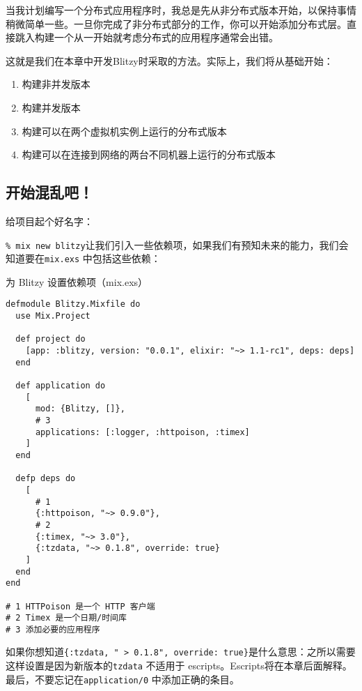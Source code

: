 当我计划编写一个分布式应用程序时，我总是先从非分布式版本开始，以保持事情稍微简单一些。一旦你完成了非分布式部分的工作，你可以开始添加分布式层。直接跳入构建一个从一开始就考虑分布式的应用程序通常会出错。

这就是我们在本章中开发Blitzy时采取的方法。实际上，我们将从基础开始：

\begin{enumerate}
\def\labelenumi{\arabic{enumi}.}

\item  构建非并发版本
\item  构建并发版本
\item  构建可以在两个虚拟机实例上运行的分布式版本
\item  构建可以在连接到网络的两台不同机器上运行的分布式版本
\end{enumerate}

\subsection{开始混乱吧！}

给项目起个好名字：

\texttt{\% mix new blitzy}让我们引入一些依赖项，如果我们有预知未来的能力，我们会知道要在\texttt{mix.exs} 中包括这些依赖：

\begin{code}{为 Blitzy 设置依赖项（mix.exs）}

\begin{verbatim}
defmodule Blitzy.Mixfile do
  use Mix.Project

  def project do
    [app: :blitzy, version: "0.0.1", elixir: "~> 1.1-rc1", deps: deps]
  end

  def application do
    [
      mod: {Blitzy, []},
      # 3
      applications: [:logger, :httpoison, :timex]
    ]
  end

  defp deps do
    [
      # 1
      {:httpoison, "~> 0.9.0"},
      # 2
      {:timex, "~> 3.0"},
      {:tzdata, "~> 0.1.8", override: true}
    ]
  end
end

# 1 HTTPoison 是一个 HTTP 客户端
# 2 Timex 是一个日期/时间库
# 3 添加必要的应用程序
\end{verbatim}
\end{code}



如果你想知道\texttt{\{:tzdata, "~> 0.1.8", override: true\}}是什么意思：之所以需要这样设置是因为新版本的\texttt{tzdata} 不适用于 escripts。Escripts将在本章后面解释。
最后，不要忘记在\texttt{application/0} 中添加正确的条目。


